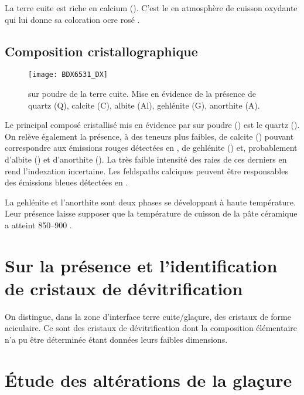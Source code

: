 La terre cuite est riche en calcium (). C'est 
le  en atmosphère de cuisson oxydante qui lui donne sa 
coloration ocre rosé \autocite{Echallier_1984}.

\subsection{Composition cristallographique}
\begin{figure}[htb]
  \texttt{[image: BDX6531\_DX]}
  \caption[\ -- \DX sur poudre de la terre cuite]
          {\legendeA 
           \DX sur poudre de la terre cuite. 
           Mise en évidence de la présence de quartz (Q), calcite (C), 
           albite (Al), gehlénite (G), anorthite (A).}
  \label{DRX:6531}
\end{figure}

Le principal composé cristallisé mis en évidence par \DX sur poudre () est le quartz (). On relève également la présence, à des teneurs plus faibles, de calcite () pouvant correspondre aux émissions rouges détectées en \CL, de gehlénite () et, probablement d'albite () et d'anorthite (). La très faible intensité des raies de ces derniers en rend l'indexation incertaine. Les feldspaths calciques peuvent être responsables des émissions bleues détectées en \CL.

La gehlénite et l'anorthite sont deux phases se développant à 
haute température. Leur présence laisse supposer que la température 
de cuisson de la pâte céramique a atteint 
\SIrange[range-phrase=\ à\ ]{850}{900}{\degC} \autocite{Peters_1978}.


\section{Sur la présence et l'identification de cristaux de 
         dévitrification}

On distingue, dans la zone d'interface terre cuite/glaçure, des 
cristaux de forme aciculaire. Ce sont des cristaux de dévitrification 
dont la composition élémentaire n'a pu être déterminée étant données 
leurs faibles dimensions.


\section{Étude des altérations de la glaçure}

